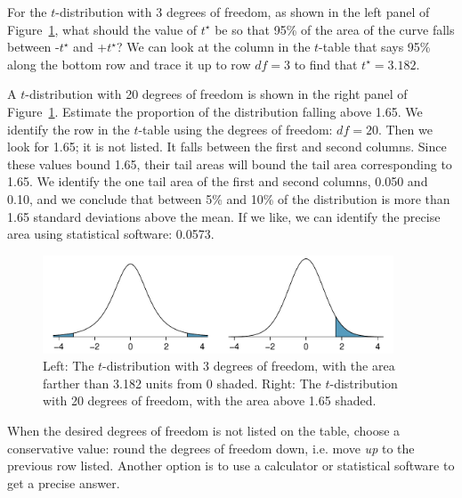 \begin{examplewrap}
\begin{nexample}{For the $t$-distribution with 3 degrees of freedom, as shown in the left panel of Figure~\ref{tDistDF3_and_20}, what should the value of $t^{\star}$ be so that 95\% of the area of the curve falls between -$t^{\star}$ and +$t^{\star}$?}
We can look at the column in the $t$-table that says 95\% along the bottom row and trace it up to row $df = 3$ to find that $t^{\star} = 3.182$.
\end{nexample}
\end{examplewrap}

\begin{examplewrap}
\begin{nexample}{A $t$-distribution with 20 degrees of freedom is shown in the right panel of Figure~\ref{tDistDF3_and_20}. Estimate the proportion of the distribution falling above 1.65.}
We identify the row in the $t$-table using the degrees of freedom: $df=20$. Then we look for 1.65; it is not listed. It falls between the first and second columns. Since these values bound 1.65, their tail areas will bound the tail area corresponding to 1.65. We identify the one tail area of the first and second columns, 0.050 and 0.10, and we conclude that between 5\% and 10\% of the distribution is more than 1.65 standard deviations above the mean. If we like, we can identify the precise area using statistical software: 0.0573.
\end{nexample}
\end{examplewrap}

\begin{figure}
\centering
\includegraphics[width=0.93\textwidth]{ch_inference_for_means/figures/tDistDF3_and_20/tDistDF3_and_20}
\caption{Left: The $t$-distribution with 3 degrees of freedom, with the area farther than 3.182 units from 0 shaded.  Right: The $t$-distribution with 20 degrees of freedom, with the area above 1.65 shaded.}
\label{tDistDF3_and_20}
\end{figure}

When the desired degrees of freedom is not listed on the table, choose a conservative value: round the degrees of freedom down, i.e. move \emph{up} to the previous row listed. Another option is to use a calculator or statistical software to get a precise answer.


